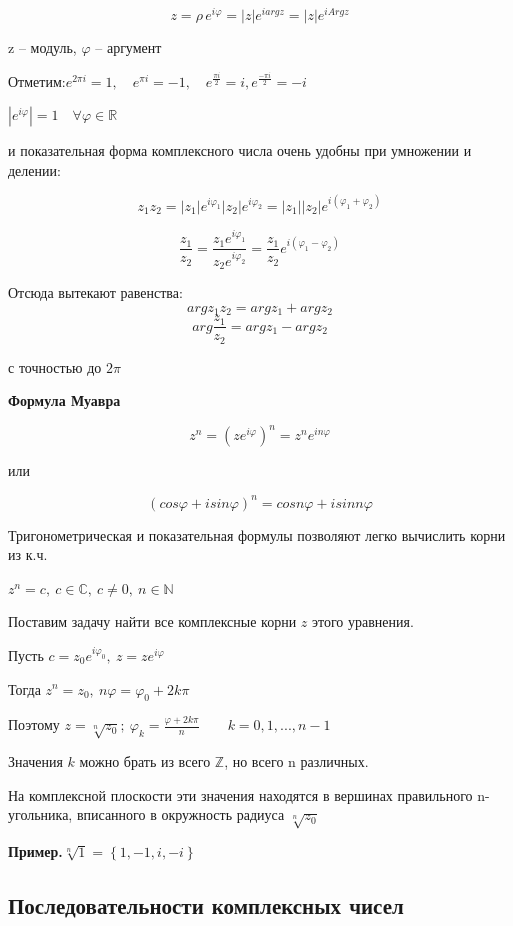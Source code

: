 \documentclass[a4paper, 12pt]{report}
\begin{document}
 $$z=\rho\,e^{i\varphi}=|z|e^{iarg z}=|z|e^{iArg z}$$
 
 z -- модуль, $\varphi$ -- аргумент
 \par\bigskip
 Отметим:\quad $e^{2\pi i}=1,\quad e^{\pi i}=-1,\quad e^{\frac{\pi i}{2}}=i, e^{\frac{-\pi i}{2}}=-i$
 
 $|e^{i\varphi}|=1\quad \forall \varphi \in \mathbb{R}$
 
  и показательная форма комплексного числа очень удобны при умножении и делении:
 
 $$z_1z_2=|z_1| e^{i\varphi_1}|z_2|e^{i\varphi_2}=|z_1||z_2|e^{i(\varphi_1+\varphi_2)}$$
 
 $$\frac{z_1}{z_2}=\frac{z_1e^{i\varphi_1}}{z_2e^{i\varphi_2}}=\frac{z_1}{z_2}e^{i(\varphi_1-\varphi_2)}$$
 \par\bigskip
 Отсюда вытекают равенства:
 $$arg z_1z_2=arg z_1+arg z_2$$
 $$arg\frac{z_1}{z_2}=arg z_1-arg z_2$$

 с точностью до $2\pi$
 \par\bigskip
 \textbf{Формула Муавра}

$$z^n=(ze^{i\varphi})^n=z^ne^{in\varphi}$$

 или

$$(cos \varphi+isin \varphi)^n=cos n\varphi+isin n\varphi$$

\par\bigskip
 Тригонометрическая и показательная формулы позволяют легко вычислить корни из к.ч.
 
 \par\bigskip $z^n=c,\ c\in \mathbb{C},\ c\neq 0,\ n\in \mathbb{N} $
 \par\bigskip
 Поставим задачу найти все комплексные корни $z$ этого уравнения. 
 \par\bigskip
 Пусть $c=z_0e^{i\varphi_0},\ z=ze^{i\varphi}$

 Тогда $z^n=z_0,\ n\varphi=\varphi_0+2k\pi$
 
 Поэтому $z=\sqrt[n]{z_0};\ \varphi_k=\frac{\varphi+2k\pi}{n} \quad \quad k=0,1,...,n-1$

 Значения $k$ можно брать из всего $\mathbb{Z}$, но всего n различных.

 На комплексной плоскости эти значения находятся в вершинах правильного n-угольника, вписанного в окружность радиуса $\sqrt[n]{z_0}$
 \par\bigskip
 \textbf{Пример.}\quad $\sqrt[n]{1}=\left\{1,-1,i,-i\right\}$
 
 
 
 \subsection{Последовательности комплексных чисел}  
 
\end{document}
